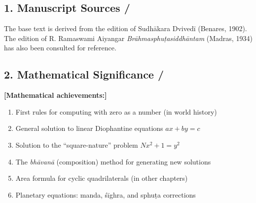 \documentclass[10pt,a4paper]{article}
\begin{document}
\vspace{2em}

\subsection*{1. Manuscript Sources / }

\begin{minipage}[t]{0.47\textwidth}
\end{minipage}%
\hfill\vline\hfill%
\begin{minipage}[t]{0.47\textwidth}
The base text is derived from the edition of Sudhākara Dvivedī (Benares, 1902).
The edition of R. Ramaswami Aiyangar \textit{Brāhmasphuṭasiddhāntam} (Madras, 1934)
has also been consulted for reference.
\end{minipage}

\vspace{1.5em}

\subsection*{2. Mathematical Significance / }

\begin{minipage}[t]{0.47\textwidth}
\end{minipage}%
\hfill\vline\hfill%
\begin{minipage}[t]{0.47\textwidth}
\textbf{[Mathematical achievements:]}
\begin{enumerate}
\item First rules for computing with zero as a number (in world history)
\item General solution to linear Diophantine equations $ax + by = c$
\item Solution to the ``square-nature'' problem $Nx^2 + 1 = y^2$
\item The \textit{bhāvanā} (composition) method for generating new solutions
\item Area formula for cyclic quadrilaterals (in other chapters)
\item Planetary equations: manda, śīghra, and sphuṭa corrections
\end{enumerate}
\end{minipage}
\end{document}
